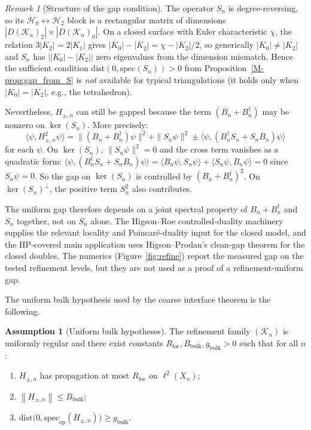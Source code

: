 \documentclass[11pt]{article}
\numberwithin{equation}{section}
\theoremstyle{definition}
\newtheorem{assumption}[theorem]{Assumption}
\theoremstyle{remark}
\newtheorem{remark}[theorem]{Remark}
\newcommand{\K}{\mathcal{K}}
\newcommand{\Hil}{\mathcal{H}}
\newcommand{\spec}{\mathrm{spec}}
\newcommand{\dist}{\mathrm{dist}}
\newcommand{\opnorm}[1]{\left\lVert#1\right\rVert}
\begin{document}
\begin{remark}[Structure of the gap condition]\label{rem:gap_structure}
The operator $S_n$ is degree-reversing, so its $\Hil_0\leftrightarrow\Hil_2$ block is a
rectangular matrix of dimensions $|D(\K_n)_2|\times|D(\K_n)_0|$. On a closed surface with Euler
characteristic $\chi$, the relation $3|K_2|=2|K_1|$ gives $|K_0|-|K_2|=\chi-|K_2|/2$, so
generically $|K_0|\neq|K_2|$ and $S_n$ has $\bigl||K_0|-|K_2|\bigr|$ zero eigenvalues from the
dimension mismatch. Hence the sufficient condition $\dist(0,\spec(S_n))>0$ from
Proposition~\ref{M-prop:gap_from_S} is \emph{not} available for typical triangulations (it holds only
when $|K_0|=|K_2|$, e.g., the tetrahedron).

Nevertheless, $H_{\pm,n}$ can still be gapped because the term $(B_n+B_n^\dagger)$ may be nonzero
on $\ker(S_n)$. More precisely:
\[
\langle\psi, H_{\pm,n}^2\psi\rangle
=
\|(B_n+B_n^\dagger)\psi\|^2+\|S_n\psi\|^2
\pm\langle\psi,(B_n^\dagger S_n+S_nB_n)\psi\rangle
\]
for each $\psi$. On $\ker(S_n)$, $\|S_n\psi\|^2=0$ and the cross term vanishes as a quadratic form:
$\langle\psi,(B_n^\dagger S_n+S_nB_n)\psi\rangle=\langle B_n\psi,S_n\psi\rangle+\langle
S_n\psi,B_n\psi\rangle=0$ since $S_n\psi=0$. So the gap on $\ker(S_n)$ is controlled by
$(B_n+B_n^\dagger)^2$. On $\ker(S_n)^\perp$, the positive term $S_n^2$ also contributes.

The uniform gap therefore depends on a joint spectral property of $B_n+B_n^\dagger$ and $S_n$
together, not on $S_n$ alone. The Higson--Roe controlled-duality machinery supplies the relevant
locality and Poincar\'e-duality input for the closed model, and the HP-covered main application
uses Higson--Prodan's clean-gap theorem for the closed doubles. The numerics
(Figure~\ref{fig:refine}) report the measured gap on the tested refinement levels, but they are not
used as a proof of a refinement-uniform gap.
\end{remark}

The uniform bulk hypothesis used by the coarse interface theorem is the following.

\begin{assumption}[Uniform bulk hypotheses]\label{ass:uniform_bulk}
The refinement family $(\K_n)$ is uniformly regular and there exist constants
$R_{\mathrm{loc}},B_{\mathrm{bulk}},g_{\mathrm{bulk}}>0$ such that for all $n$:
\begin{enumerate}[label=(\alph*),leftmargin=2em]
\item $H_{\pm,n}$ has propagation at most $R_{\mathrm{loc}}$ on $\ell^2(X_n)$;
\item $\opnorm{H_{\pm,n}}\le B_{\mathrm{bulk}}$;
\item $\dist\bigl(0,\spec_{\mathrm{op}}(H_{\pm,n})\bigr)\ge g_{\mathrm{bulk}}$.
\end{enumerate}
\end{assumption}
\end{document}
